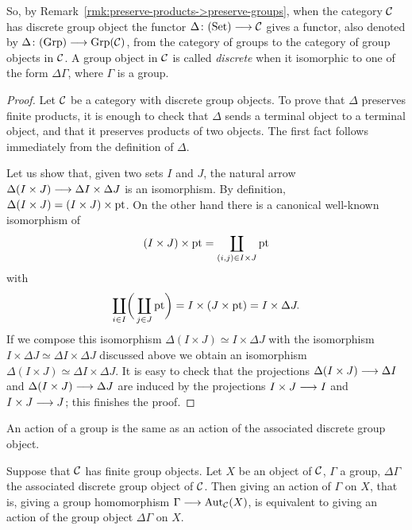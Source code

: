 \begin{2   CONTRAVARIANT FUNCTORS}
\begin{2.2 Group objects}
So, by Remark~\ref{rmk:preserve-products->preserve-groups}, when the category $\mathcal{C}$ has discrete group object the functor $\Delta \colon \catset \arr \cC$ gives a functor, also denoted by $\Delta \colon \catgrp \arr \catgrpover{\cC}$, from the category of groups to the category of group objects in $\mathcal{C}$. A group object in $\mathcal{C}$ is called \emph{discrete}%
%
 when it isomorphic to one of the form $\Delta\Gamma$, where $\Gamma$ is a group.

\begin{proof}

Let $\mathcal{C}$ be a category with discrete group objects. To prove that $\Delta$ preserves finite products, it is enough to check that $\Delta$ sends a terminal object to a terminal object, and that it preserves products of two objects. The  first fact follows  immediately from the definition of $\Delta$.

Let us show that, given two sets $I$ and $J$, the natural arrow $\Delta(I \times J) \arr \Delta I \times \Delta J$ is an isomorphism. By definition, $\Delta(I \times J) = (I \times J) \times \mathrm{pt}$. On the other hand there is a canonical well-known isomorphism of
   \[
   (I \times J) \times \mathrm{pt} = \coprod_{(i,j) \in I \times J} \mathrm{pt}
   \]
with
   \[
   \coprod_{i \in I} \biggl(\,\coprod_{j \in J}
   \mathrm{pt}\biggr) = I \times (J
   \times \mathrm{pt}) = I \times \Delta J.
   \]
If we compose this isomorphism $\Delta(I \times J) \simeq I \times \Delta J$ with the isomorphism $I \times \Delta J \simeq \Delta I \times \Delta J$ discussed above we obtain an isomorphism $\Delta(I \times J) \simeq \Delta I \times \Delta J$. It is easy to check that the projections $\Delta(I \times J) \arr \Delta I$ and $\Delta(I \times J) \arr \Delta J$ are induced by the projections $I \times J \arr I$ and $I \times J \arr J$; this finishes the proof.
\end{proof}

An action of a group is the same as an action of the associated discrete group object.

\begin{proposition}\label{prop:action-discrete-group}%
Suppose that $\mathcal{C}$ has finite group objects. Let $X$ be an object of $\mathcal{C}$, $\Gamma$ a group, $\Delta\Gamma$ the associated discrete group object of $\mathcal{C}$. Then giving an action of $\Gamma$ on $X$, that is, giving a group homomorphism $\Gamma \arr \aut_{\cC}(X)$, is equivalent to giving an action of the group object $\Delta\Gamma$ on $X$.
\end{proposition}


\end{2.2 Group objects}
\end{2   CONTRAVARIANT FUNCTORS}
